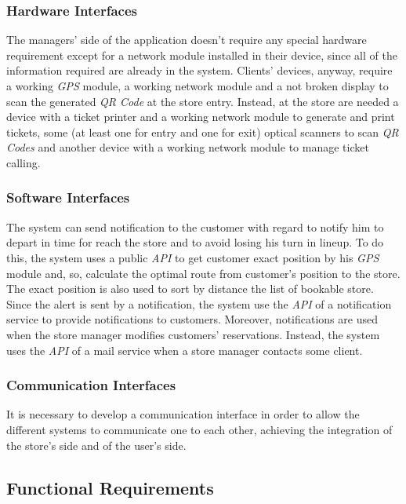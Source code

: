 \documentclass{article}
\begin{document}
			
		\subsubsection{Hardware Interfaces}
		
			The managers’ side of the application doesn’t require any special hardware requirement except for a network module installed in their device, since all of the information required are already in the system. Clients’ devices, anyway, require a working \emph{GPS} module, a working network module and a not broken display to scan the generated \emph{QR Code} at the store entry. Instead, at the store are needed a device with a ticket printer and a working network module to generate and print tickets, some (at least one for entry and one for exit) optical scanners to scan \emph{QR Codes} and another device with a working network module to manage ticket calling.
			
			
		\subsubsection{Software Interfaces}
		
			The system can send notification to the customer with regard to notify him to depart in time for reach the store and to avoid losing his turn in lineup. To do this, the system uses a public \emph{API} to get customer exact position by his \emph{GPS} module and, so, calculate the optimal route from customer's position to the store. The exact position is also used to sort by distance the list of bookable store. Since the alert is sent by a notification, the system use the \emph{API} of a notification service to provide notifications to customers. Moreover, notifications are used when the store manager modifies customers' reservations. Instead, the system uses the \emph{API} of a mail service when a store manager contacts some client.
			
		\subsubsection{Communication Interfaces}
		
			It is necessary to develop a communication interface in order to allow the different systems to communicate one to each other, achieving the integration of the store’s side and of the user’s side.
	\newpage
	\subsection{Functional Requirements}
	
\end{document}
